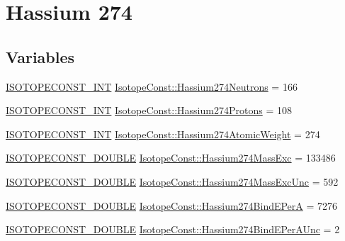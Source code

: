 \hypertarget{group___isotope_const-_hassium-_hs274}{}\section{Hassium 274}
\label{group___isotope_const-_hassium-_hs274}
\subsection*{Variables}
\begin{DoxyCompactItemize}
\item 
\mbox{\hyperlink{group___isotope_const-_macros_ga5f18360b3e99483a35c32d789e62621c}{I\+S\+O\+T\+O\+P\+E\+C\+O\+N\+S\+T\+\_\+\+I\+NT}} \mbox{\hyperlink{group___isotope_const-_hassium-_hs274_ga03bd26f90c0fb920345228123c721f57}{Isotope\+Const\+::\+Hassium274\+Neutrons}} = 166
\item 
\mbox{\hyperlink{group___isotope_const-_macros_ga5f18360b3e99483a35c32d789e62621c}{I\+S\+O\+T\+O\+P\+E\+C\+O\+N\+S\+T\+\_\+\+I\+NT}} \mbox{\hyperlink{group___isotope_const-_hassium-_hs274_gada69ea7bc3c43709c0e83f89816ae8be}{Isotope\+Const\+::\+Hassium274\+Protons}} = 108
\item 
\mbox{\hyperlink{group___isotope_const-_macros_ga5f18360b3e99483a35c32d789e62621c}{I\+S\+O\+T\+O\+P\+E\+C\+O\+N\+S\+T\+\_\+\+I\+NT}} \mbox{\hyperlink{group___isotope_const-_hassium-_hs274_ga32f1e37b699672e433a9537a3bbb36b2}{Isotope\+Const\+::\+Hassium274\+Atomic\+Weight}} = 274
\item 
\mbox{\hyperlink{group___isotope_const-_macros_ga8f45a7272ce02c0b4c65c44636ed719a}{I\+S\+O\+T\+O\+P\+E\+C\+O\+N\+S\+T\+\_\+\+D\+O\+U\+B\+LE}} \mbox{\hyperlink{group___isotope_const-_hassium-_hs274_ga611ad32bcb46dadd7f387ca2aa13018e}{Isotope\+Const\+::\+Hassium274\+Mass\+Exc}} = 133486
\item 
\mbox{\hyperlink{group___isotope_const-_macros_ga8f45a7272ce02c0b4c65c44636ed719a}{I\+S\+O\+T\+O\+P\+E\+C\+O\+N\+S\+T\+\_\+\+D\+O\+U\+B\+LE}} \mbox{\hyperlink{group___isotope_const-_hassium-_hs274_gae74e0cf5d91b2c8ff6c810080642b3b1}{Isotope\+Const\+::\+Hassium274\+Mass\+Exc\+Unc}} = 592
\item 
\mbox{\hyperlink{group___isotope_const-_macros_ga8f45a7272ce02c0b4c65c44636ed719a}{I\+S\+O\+T\+O\+P\+E\+C\+O\+N\+S\+T\+\_\+\+D\+O\+U\+B\+LE}} \mbox{\hyperlink{group___isotope_const-_hassium-_hs274_gaaeda48a9dd62f02de26a8d06b87eeb27}{Isotope\+Const\+::\+Hassium274\+Bind\+E\+PerA}} = 7276
\item 
\mbox{\hyperlink{group___isotope_const-_macros_ga8f45a7272ce02c0b4c65c44636ed719a}{I\+S\+O\+T\+O\+P\+E\+C\+O\+N\+S\+T\+\_\+\+D\+O\+U\+B\+LE}} \mbox{\hyperlink{group___isotope_const-_hassium-_hs274_gaa8a34456705901e8830d8687b4c72e37}{Isotope\+Const\+::\+Hassium274\+Bind\+E\+Per\+A\+Unc}} = 2

\end{DoxyCompactItemize}
